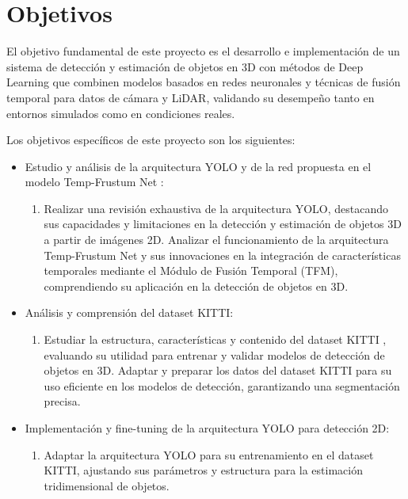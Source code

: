 \section{Objetivos}
\label{sec:objetivos-y-campo}


El objetivo fundamental de este proyecto es el desarrollo e implementación de un sistema de detección y estimación de objetos en 3D con métodos de Deep Learning que combinen modelos basados en redes neuronales y técnicas de fusión temporal para datos de cámara y LiDAR, validando su desempeño tanto en entornos simulados como en condiciones reales.


Los objetivos específicos de este proyecto son los siguientes:
\begin{itemize}
	\item Estudio y análisis de la arquitectura YOLO \cite{yolo} y de la red propuesta en el modelo Temp-Frustum Net \cite{frustum}:
	\begin{enumerate}
		\item Realizar una revisión exhaustiva de la arquitectura YOLO, destacando sus capacidades y limitaciones en la detección y estimación de objetos 3D a partir de imágenes 2D.
		Analizar el funcionamiento de la arquitectura Temp-Frustum Net y sus innovaciones en la integración de características temporales mediante el Módulo de Fusión Temporal (TFM), comprendiendo su aplicación en la detección de objetos en 3D.
	\end{enumerate}
	
	\item Análisis y comprensión del dataset KITTI:
	\begin{enumerate}
		\item Estudiar la estructura, características y contenido del dataset KITTI \cite{kitti}, evaluando su utilidad para entrenar y validar modelos de detección de objetos en 3D.
		Adaptar y preparar los datos del dataset KITTI para su uso eficiente en los modelos de detección, garantizando una segmentación precisa. 
	\end{enumerate}
	
	\item Implementación y fine-tuning de la arquitectura YOLO para detección 2D:
	\begin{enumerate}
		\item Adaptar la arquitectura YOLO para su entrenamiento en el dataset KITTI, ajustando sus parámetros y estructura para la estimación tridimensional de objetos.
	\end{enumerate}
	

\end{itemize}
